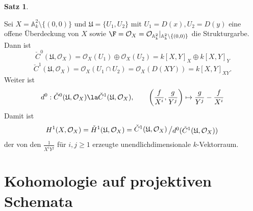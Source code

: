 \documentclass[11pt]{book}
\newtheorem{theorem}{Satz}[section]
\theoremstyle{nonumberbreak}
\newenvironment{pr}[1][]{\ifthenelse{\equal{#1}{}}{\proof}{\proof[#1]}\rm}{\endproof}
\newenvironment{ex}[1][]{\ifthenelse{\equal{#1}{}}{\example}{\example[#1]}\rm}{\endexample}
\newcommand{\slant}[2]{{\raisebox{.1em}{$#1$}\left/\raisebox{-.1em}{$#2$}\right.}}
\begin{document}
\begin{spacing}{1.4}
\begin{theorem}
\begin{pr}
\begin{compactenum}
\end{compactenum}

\end{pr}

\end{theorem}


\begin{ex}
Sei $X=\mathbb{A}^{2}_k \setminus \{(0,0)\}$ und $\mathfrak{U}=\{U_1, U_2\}$ mit $U_1 = D(x), U_2 =D(y)$ eine offene Überdeckung von $X$ sowie $\F = \mathcal{O}_X = \mathcal{O}_{\mathbb{A}^2_k} \vert_{\mathbb{A}^2_k \setminus \{(0,0)\}}$ die Strukturgarbe. Dann ist 
$$\check{C}^{0}(\mathfrak{U}, \mathcal{O}_X) = \mathcal{O}_X(U_1) \oplus \mathcal{O}_X(U_2) = k[X,Y]_X \oplus k[X,Y]_Y$$
$$\check{C}^{1}(\mathfrak{U}, \mathcal{O}_X) = \mathcal{O}_X(U_1 \cap U_2) = \mathcal{O}_X(D(XY)) = k[X,Y]_{XY}.$$
Weiter ist 
$$d^{0}: \check{C}^{0}(\mathfrak{U}, \mathcal{O}_X) \la \check{C}^{1}(\mathfrak{U}, \mathcal{O}_X), \qquad \left( \frac{f}{X^{i}}, \frac{g}{Y^{j}} \right) \mapsto \frac{g}{Y^{j}} - \frac{f}{X^{i}}$$
Damit ist 
$$H^{1}(X, \mathcal{O}_X) = \check{H}^{1}(\mathfrak{U}, \mathcal{O}_X) = \slant{\check{C}^{1}(\mathfrak{U}, \mathcal{O}_X)}{d^{0}(\check{C}^{1}(\mathfrak{U}, \mathcal{O}_X))}$$
der von den $\frac{1}{X^{i}Y^{j}}$ für $i,j \geqslant 1$ erzeugte unendlichdimensionale $k$-Vektorraum.
\end{ex}









\renewcommand*\thesection{§ \arabic{section}\quad}
\section{Kohomologie auf projektiven Schemata} %
\renewcommand*\thesection{\arabic{section}}



\end{spacing}
\end{document}
